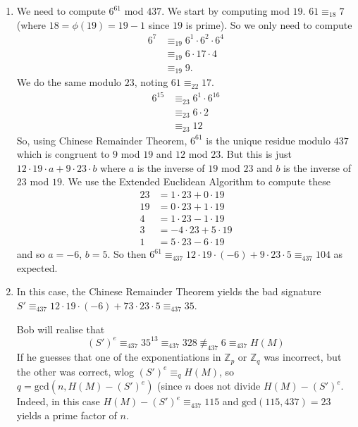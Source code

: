 \begin{enumerate}
\item We need to compute $6^{61}$ mod $437$. We start by computing mod $19$.
$61 \equiv_{18} 7$ (where $18=\phi(19)=19-1$ since $19$ is prime). So we only
need to compute 
\begin{align*}
6^7 &\equiv_{19} 6^1 \cdot 6^2 \cdot 6^4 \\
	&\equiv_{19} 6 \cdot 17 \cdot 4 \\
	&\equiv_{19} 9.
\end{align*}
We do the same modulo $23$, noting $61 \equiv_{22} 17$.
\begin{align*}
6^{15} &\equiv_{23} 6^1 \cdot 6^{16} \\
 &\equiv_{23} 6 \cdot 2 \\
 &\equiv_{23} 12
\end{align*}
So, using Chinese Remainder Theorem, $6^{61}$ is the unique residue modulo $437$
which is congruent to $9$ mod $19$ and $12$ mod $23$. But this is just
$12 \cdot 19 \cdot a + 9 \cdot 23 \cdot b$ where $a$ is the inverse of $19$
mod $23$ and $b$ is the inverse of $23$ mod $19$. We use the Extended Euclidean
Algorithm to compute these
\begin{align*}
23 &= 1 \cdot 23 + 0 \cdot 19 \\
19 &= 0 \cdot 23 + 1 \cdot 19 \\
4 &= 1 \cdot 23 - 1 \cdot 19 \\
3 &= -4 \cdot 23 + 5 \cdot 19 \\
1 &= 5 \cdot 23 - 6 \cdot 19
\end{align*}
and so $a=-6$, $b=5$.
So then $6^{61} \equiv_{437} 12 \cdot 19 \cdot (-6) + 9 \cdot 23 \cdot 5 \equiv_{437} 104$
as expected.

\item In this case, the Chinese Remainder Theorem yields the bad signature
$S'\equiv_{437} 12 \cdot 19 \cdot (-6) + 73 \cdot 23 \cdot 5 \equiv_{437} 35$.

Bob will realise that $$(S')^e \equiv_{437} 35^{13} \equiv_{437} 328 \not\equiv_{437} 6 \equiv_{437} H(M)$$
If he guesses that one of the exponentiations in $\mathbb{Z}_p$ or $\mathbb{Z}_q$ was incorrect, but
the other was correct, wlog $(S')^e \equiv_q H(M)$, so $q=\text{gcd}(n,H(M)-(S')^e)$
(since $n$ does not divide $H(M)-(S')^e$. Indeed, in this case $H(M)-(S')^e \equiv_{437} 115$
and $\text{gcd}(115,437)=23$ yields a prime factor of $n$.

\end{enumerate}
